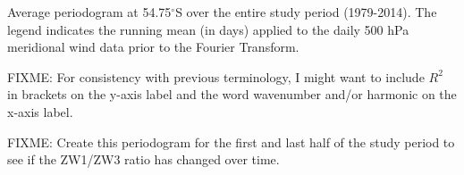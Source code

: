 \label{fig:fourier_spectrum}
Average periodogram at 54.75$^{\circ}$S over the entire study period (1979-2014). The legend indicates the running mean (in days) applied to the daily 500 hPa meridional wind data prior to the Fourier Transform. 

FIXME: For consistency with previous terminology, I might want to include $R^2$ in brackets on the y-axis label and the word wavenumber and/or harmonic on the x-axis label.

FIXME: Create this periodogram for the first and last half of the study period to see if the ZW1/ZW3 ratio has changed over time.
